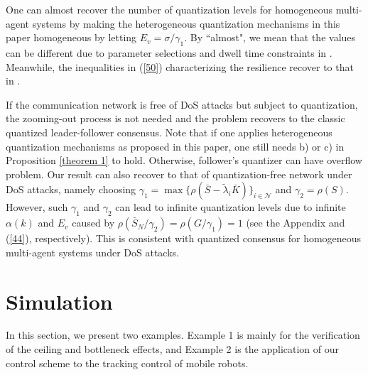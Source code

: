 \documentclass{autart}
\begin{document}
One can almost recover the number of quantization levels for homogeneous multi-agent systems by making the heterogeneous quantization mechanisms in this paper homogeneous by letting $E_v = \sigma/\gamma_1$. By ``almost", we mean that the values can be different due to parameter selections and dwell time constraints in \cite{feng2020arxiv}. Meanwhile, the  inequalities in (\ref{50}) characterizing the resilience recover to that in \cite{feng2020arxiv}. 


If the communication network is free of DoS attacks but subject to quantization, the zooming-out process is not needed and the problem recovers to the classic quantized leader-follower consensus. Note that if one applies heterogeneous quantization mechanisms as proposed in this paper, one still needs b) or c) in Proposition \ref{theorem 1} to hold. Otherwise, follower's quantizer can have overflow problem. Our result can also recover to that of quantization-free network under DoS attacks, namely choosing $\gamma_1 = \max \{\rho(\bar S - \tilde \lambda _i \bar K) \}_{i \in \mathcal N}$ and $\gamma_2 = \rho(S)$. However, such $\gamma_1$ and $\gamma_2$ can lead to infinite quantization levels due to infinite $\alpha(k)$ and $E_v$ caused by $\rho(\bar S_N /\gamma_2) = \rho(G/\gamma_1) =1$ (see the Appendix and (\ref{44}), respectively). This is consistent with quantized consensus for homogeneous multi-agent systems under DoS attacks.    




\section{Simulation}

				
			In this section, we present two examples. Example 1 is mainly for the verification of the ceiling and bottleneck effects, and Example 2 is the application of our control scheme to the tracking control of mobile robots.
				
\end{document}
